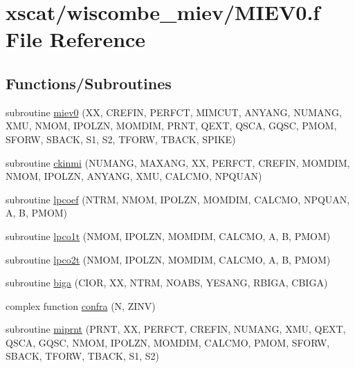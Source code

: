 \hypertarget{_m_i_e_v0_8f}{}\section{xscat/wiscombe\+\_\+miev/\+M\+I\+E\+V0.f File Reference}
\label{_m_i_e_v0_8f}
\subsection*{Functions/\+Subroutines}
\begin{DoxyCompactItemize}
\item 
subroutine \hyperlink{_m_i_e_v0_8f_a48092e733ab76cc9db0501ed3b28d9ff}{miev0} (XX, C\+R\+E\+F\+IN, P\+E\+R\+F\+CT, M\+I\+M\+C\+UT, A\+N\+Y\+A\+NG, N\+U\+M\+A\+NG, X\+MU, N\+M\+OM, I\+P\+O\+L\+ZN, M\+O\+M\+D\+IM, P\+R\+NT, Q\+E\+XT, Q\+S\+CA, G\+Q\+SC, P\+M\+OM, S\+F\+O\+RW, S\+B\+A\+CK, S1, S2, T\+F\+O\+RW, T\+B\+A\+CK, S\+P\+I\+KE)
\item 
subroutine \hyperlink{_m_i_e_v0_8f_aeb0cfc95aa7e21e9ada7c4cb634d6c92}{ckinmi} (N\+U\+M\+A\+NG, M\+A\+X\+A\+NG, XX, P\+E\+R\+F\+CT, C\+R\+E\+F\+IN, M\+O\+M\+D\+IM, N\+M\+OM, I\+P\+O\+L\+ZN, A\+N\+Y\+A\+NG, X\+MU, C\+A\+L\+C\+MO, N\+P\+Q\+U\+AN)
\item 
subroutine \hyperlink{_m_i_e_v0_8f_a8f1c192fc6a73a6b9e55d5a52de1f201}{lpcoef} (N\+T\+RM, N\+M\+OM, I\+P\+O\+L\+ZN, M\+O\+M\+D\+IM, C\+A\+L\+C\+MO, N\+P\+Q\+U\+AN, A, B, P\+M\+OM)
\item 
subroutine \hyperlink{_m_i_e_v0_8f_a6fcb83505689f74c82cf122a250675b6}{lpco1t} (N\+M\+OM, I\+P\+O\+L\+ZN, M\+O\+M\+D\+IM, C\+A\+L\+C\+MO, A, B, P\+M\+OM)
\item 
subroutine \hyperlink{_m_i_e_v0_8f_af491bde683b4a07ee245f9c3e53c6894}{lpco2t} (N\+M\+OM, I\+P\+O\+L\+ZN, M\+O\+M\+D\+IM, C\+A\+L\+C\+MO, A, B, P\+M\+OM)
\item 
subroutine \hyperlink{_m_i_e_v0_8f_affcbe26d3e8beb59e07c207f2b0da43a}{biga} (C\+I\+OR, XX, N\+T\+RM, N\+O\+A\+BS, Y\+E\+S\+A\+NG, R\+B\+I\+GA, C\+B\+I\+GA)
\item 
complex function \hyperlink{_m_i_e_v0_8f_ad91aace4d77229d367c28c78965a0bd5}{confra} (N, Z\+I\+NV)
\item 
subroutine \hyperlink{_m_i_e_v0_8f_ac887bd1b637c8d2b27df19d1163aad55}{miprnt} (P\+R\+NT, XX, P\+E\+R\+F\+CT, C\+R\+E\+F\+IN, N\+U\+M\+A\+NG, X\+MU, Q\+E\+XT, Q\+S\+CA, G\+Q\+SC, N\+M\+OM, I\+P\+O\+L\+ZN, M\+O\+M\+D\+IM, C\+A\+L\+C\+MO, P\+M\+OM, S\+F\+O\+RW, S\+B\+A\+CK, T\+F\+O\+RW, T\+B\+A\+CK, S1, S2)

\end{DoxyCompactItemize}
